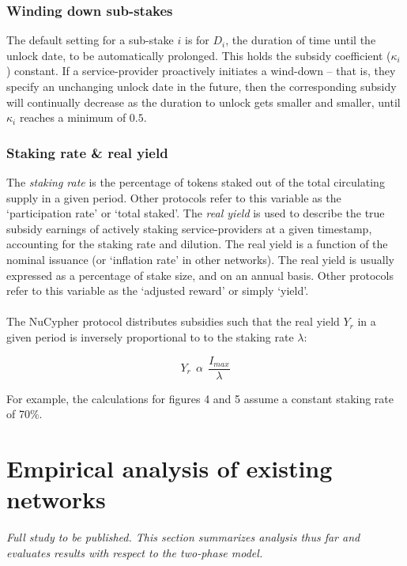 \documentclass[longbibliography,nofootinbib]{revtex4-1}
\begin{document}
\subsubsection{Winding down sub-stakes}

The default setting for a sub-stake $i$ is for $D_i$, the duration of time until the unlock date, to be automatically prolonged. This holds the subsidy coefficient ($\kappa_i$) constant. If a service-provider proactively initiates a wind-down – that is, they specify an unchanging unlock date in the future, then the corresponding subsidy will continually decrease as the duration to unlock gets smaller and smaller, until $\kappa_i$ reaches a minimum of $0.5$.

\subsubsection{Staking rate \& real yield}

The \textit{staking rate} is the percentage of tokens staked out of the total circulating supply in a given period. Other protocols refer to this variable as the `participation rate' or `total staked'. The \textit{real yield} is used to describe the true subsidy earnings of actively staking service-providers at a given timestamp, accounting for the staking rate and dilution. The real yield is a function of the nominal issuance (or `inflation rate' in other networks). The real yield is usually expressed as a percentage of stake size, and on an annual basis. Other protocols refer to this variable as the `adjusted reward' or simply `yield'. 
\\\\
The NuCypher protocol distributes subsidies such that the real yield $Y_r$ in a given period is inversely proportional to to the staking rate $\lambda$: 

\begin{equation}
    Y_r \:\:\alpha\:\: \frac{I_{max}}{\lambda}
\end{equation}

For example, the calculations for figures 4 and 5 assume a constant staking rate of 70\%.

\section{Empirical analysis of existing networks}

\textit{Full study to be published. This section summarizes analysis thus far and evaluates results with respect to the two-phase model.}
\end{document}
